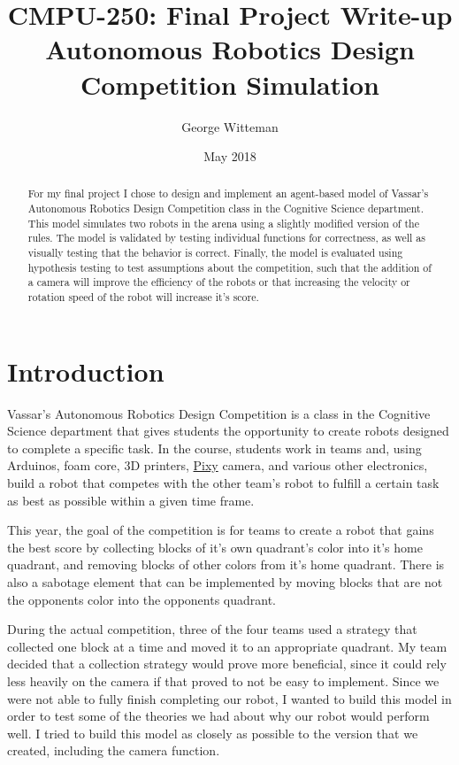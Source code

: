 \documentclass[12pt]{article}
\title{CMPU-250: Final Project Write-up \\
  \large Autonomous Robotics Design Competition Simulation}
\date{May 2018}
\author{George Witteman}
\begin{document}
\maketitle

\begin{abstract}
  For my final project I chose to design and implement an agent-based model of Vassar's Autonomous Robotics Design Competition class in the Cognitive Science department. This model simulates two robots in the arena using a slightly modified version of the rules. The model is validated by testing individual functions for correctness, as well as visually testing that the behavior is correct. Finally, the model is evaluated using hypothesis testing to test assumptions about the competition, such that the addition of a camera will improve the efficiency of the robots or that increasing the velocity or rotation speed of the robot will increase it's score.
\end{abstract}

\section{Introduction}

Vassar's Autonomous Robotics Design Competition is a class in the Cognitive Science department that gives students the opportunity to create robots designed to complete a specific task. In the course, students work in teams and, using Arduinos, foam core, 3D printers, \href{http://charmedlabs.com/default/pixy-cmucam5/}{Pixy} camera, and various other electronics, build a robot that competes with the other team's robot to fulfill a certain task as best as possible within a given time frame.

This year, the goal of the competition is for teams to create a robot that gains the best score by collecting blocks of it's own quadrant's color into it's home quadrant, and removing blocks of other colors from it's home quadrant. There is also a sabotage element that can be implemented by moving blocks that are not the opponents color into the opponents quadrant.

During the actual competition, three of the four teams used a strategy that collected one block at a time and moved it to an appropriate quadrant. My team decided that a collection strategy would prove more beneficial, since it could rely less heavily on the camera if that proved to not be easy to implement. Since we were not able to fully finish completing our robot, I wanted to build this model in order to test some of the theories we had about why our robot would perform well. I tried to build this model as closely as possible to the version that we created, including the camera function.
\end{document}
